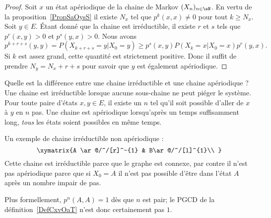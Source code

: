 \begin{proof}
	Soit \( x\) un état apériodique de la chaine de Markov \( (X_n)_{n\in \eN}\). En vertu de la proposition~\ref{PropSaOysS} il existe \( N_x\) tel que \( p^k(x,x)\neq 0\) pour tout \( k\geq N_x\). Soit \( y\in E\). Étant donné que la chaine est irréductible, il existe \( r\) et \( s\) tels que \( p^r(x,y)>0\) et \( p^s(y,x)>0\). Nous avons
	\begin{equation}
		p^{k+r+s}(y,y)=P(X_{k+r+s}=y|X_0=y)\geq p^s(x,y)P(X_k=x|X_0=x)p^r(y,x).
	\end{equation}
	Si \( k\) est assez grand, cette quantité est strictement positive. Donc il suffit de prendre \( N_y=N_x+r+s\) pour savoir que \( y\) est également apériodique.
\end{proof}

\begin{example}
	Quelle est la différence entre une chaine irréductible et une chaine apériodique ? Une chaine est irréductible lorsque aucune sous-chaine ne peut piéger le système. Pour toute paire d'états \( x,y\in E\), il existe un \( n\) tel qu'il soit possible d'aller de \( x\) à \( y\) en \( n\) pas. Une chaine est apériodique lorsqu'après un temps suffisamment long, \emph{tous} les états soient possibles en même temps.

	Un exemple de chaine irréductible non apériodique :
	\begin{equation}
		\xymatrix{%
		A \ar@/^/[r]^-{1}    &   B\ar@/^/[l]^{1}\\
		}
	\end{equation}
	Cette chaine est irréductible parce que le graphe est connexe, par contre il n'est pas apériodique parce que si \( X_0=A\) il n'est pas possible d'être dans l'état \( A\) après un nombre impair de pas.

	Plus formellement, \( p^n(A,A)=1\) dès que \( n\) est pair; le PGCD de la définition~\ref{DefCxvOaT} n'est donc certainement pas \( 1\).
\end{example}

